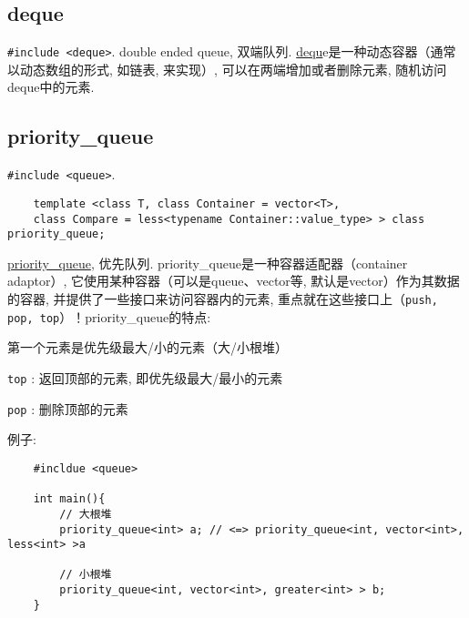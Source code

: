 \subsection{deque}
\texttt{#include <deque>}. double ended queue, 双端队列. \href{https://www.cplusplus.com/reference/deque/deque/?kw=deque}{dequ}e是一种动态容器（通常以动态数组的形式, 如链表, 来实现）, 可以在两端增加或者删除元素, 随机访问deque中的元素. 

\subsection{priority\_queue}
\texttt{#include <queue>}. 
\begin{verbatim}
	template <class T, class Container = vector<T>,
	class Compare = less<typename Container::value_type> > class priority_queue;
\end{verbatim}
\href{https://www.cplusplus.com/reference/queue/priority_queue/?kw=priority_queue}{priority\_queue}, 优先队列. priority\_queue是一种容器适配器（container adaptor）, 它使用某种容器（可以是queue、vector等, 默认是vector）作为其数据的容器, 并提供了一些接口来访问容器内的元素, 重点就在这些接口上（\texttt{push, pop, top}）！priority\_queue的特点: 
\begin{myitemize}
	\item 第一个元素是优先级最大/小的元素（大/小根堆）
	\item \texttt{top} : 返回顶部的元素, 即优先级最大/最小的元素
	\item \texttt{pop} : 删除顶部的元素
\end{myitemize}
例子: 
\begin{verbatim}
	#incldue <queue>
	
	int main(){
		// 大根堆
		priority_queue<int> a; // <=> priority_queue<int, vector<int>, less<int> >a
		
		// 小根堆
		priority_queue<int, vector<int>, greater<int> > b;
	}
\end{verbatim}


